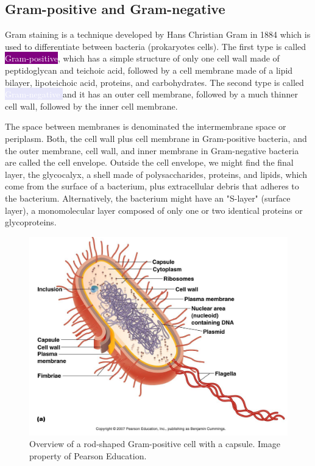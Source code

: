 \subsection{Gram-positive and Gram-negative}
\label{staph:gram-types}

Gram staining is a technique developed by Hans Christian Gram in 1884 which is used to differentiate between bacteria (prokaryotes cells). The first type is called \colorbox{Purple}{\textcolor{white}{Gram-positive}}, which has a simple structure of only one cell wall made of peptidoglycan and teichoic acid, followed by a cell membrane made of a lipid bilayer, lipoteichoic acid, proteins, and carbohydrates. The second type is called \colorbox{Lavender}{\textcolor{white}{ Gram-negative }} and it has an outer cell membrane, followed by a much thinner cell wall, followed by the inner cell membrane.

The space between membranes is denominated the intermembrane space or periplasm. Both, the cell wall plus cell membrane in Gram-positive bacteria, and the outer membrane, cell wall, and inner membrane in Gram-negative bacteria are called the cell envelope. Outside the cell envelope, we might find the final layer, the glycocalyx, a shell made of polysaccharides, proteins, and lipids, which come from the surface of a bacterium, plus extracellular debris that adheres to the bacterium. Alternatively, the bacterium might have an "S-layer" (surface layer), a monomolecular layer composed of only one or two identical proteins or glycoproteins.

    \begin{figure}[ht]
        \centering
            \includegraphics[width=0.7\linewidth]{figures/Staph/bacterialstructure.jpg}
            \caption{Overview of a rod-shaped Gram-positive cell with a capsule. Image property of Pearson Education.}
            \label{figure:capsule}
    \end{figure}

